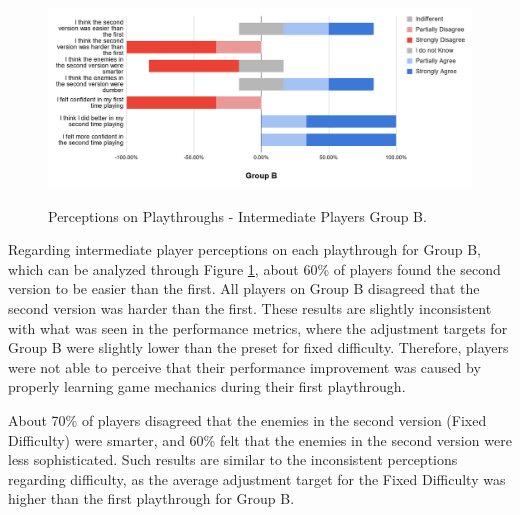 \begin{figure}[!ht]
    \begin{center}
    \caption{Perceptions on Playthroughs - Intermediate Players Group B.}
        \includegraphics[width=36em]{figures/fig-perception-versions-intermediate-players-group-b.png}
        \label{fig:perception-playthrough-intermediate-players-group-b}
    \end{center}
\end{figure}

Regarding intermediate player perceptions on each playthrough for Group B, which can be analyzed through Figure \ref{fig:perception-playthrough-intermediate-players-group-b}, about 60\% of players found the second version to be easier than the first. All players on Group B disagreed that the second version was harder than the first. These results are slightly inconsistent with what was seen in the performance metrics, where the adjustment targets for Group B were slightly lower than the preset for fixed difficulty. Therefore, players were not able to perceive that their performance improvement was caused by properly learning game mechanics during their first playthrough.

About 70\% of players disagreed that the enemies in the second version (Fixed Difficulty) were smarter, and 60\% felt that the enemies in the second version were less sophisticated. Such results are similar to the inconsistent perceptions regarding difficulty, as the average adjustment target for the Fixed Difficulty was higher than the first playthrough for Group B.

